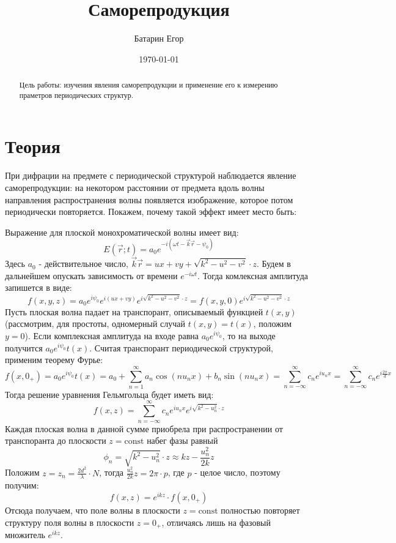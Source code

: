 \documentclass[a4paper,12pt]{article}
\author{Батарин Егор}
\title{Саморепродукция}
\date{\today}
\begin{document}
 
\maketitle
 
\begin{abstract}
   Цель работы: изучения явления саморепродукции и применение его к измерению праметров периодических структур.
\end{abstract}

\section{Теория}

При дифрации на предмете с периодической структурой наблюдается явление саморепродукции: на некотором расстоянии от предмета вдоль волны направления распространения волны появляется изображение, которое потом периодически повторяется. Покажем, почему такой эффект имеет место быть:

Выражение для плоской монохроматической волны имеет вид:
\[ E(\vec{r}; t) = a_0e^{-i(\omega t - \vec{k}\vec{r}-\psi_0)} \] 
Здесь $a_0$ - действительное число, $\vec{k}\vec{r} = ux + vy + \sqrt{k^2-u^2-v^2}\cdot z$. Будем в дальнейшем опускать зависимость от времени $e^{-i\omega t}$. Тогда комлексная амплитуда запишется в виде:
\[ f(x,y,z) = a_0e^{i\psi_0}e^{i(ux+vy)}e^{i\sqrt{k^2-u^2-v^2}\cdot z} = f(x,y,0)e^{i\sqrt{k^2-u^2-v^2}\cdot z}\]
Пусть плоская волна падает на транспорант, описываемый функцией $t(x,y)$ (рассмотрим, для простоты, одномерный случай $t(x,y) = t(x)$, положим $y=0$). Если комплексная амплитуда на входе равна $a_0e^{i\psi_0}$, то на выходе получится $a_0e^{i\psi_0}t(x)$. 
\newpage
Считая транспорант периодической структурой, применим теорему Фурье:
\[ f(x, 0_+) = a_0e^{i\psi_0}t(x) = a_0 + \sum_{n=1}^{\infty} a_n\cos{(nu_nx)} + b_n\sin{(nu_nx)}  = \sum_{n=-\infty}^{\infty} c_ne^{iu_nx} = \sum_{n=-\infty}^{\infty} c_ne^{i\frac{2\pi}{d}x} \]
Тогда решение уравнения Гельмгольца будет иметь вид:
\[f(x,z) = \sum_{n=-\infty}^{\infty} c_ne^{iu_nx}e^{i\sqrt{k^2-u^2_n}\cdot z}\]
Каждая плоская волна в данной сумме приобрела при распространении от транспоранта до плоскости $z = \textrm{const}$ набег фазы равный 
\[\phi_n = \sqrt{k^2-u_n^2}\cdot z \approx kz- \frac{u^2_n}{2k}z\]
Положим $z = z_n = \frac{2d^2}{\lambda}\cdot N$, тогда $\frac{u^2_n}{2k}z = 2\pi\cdot p$, где $p$ - целое число, поэтому получим:
\[f(x,z) = e^{ikz}\cdot f(x,0_+)\]
Отсюда получаем, что поле волны в плоскости $z = \textrm{const}$ полностью повторяет структуру поля волны в плоскости $z = 0_+$, отличаясь лишь на фазовый множитель $e^{ikz}$.
\newpage
\end{document}
